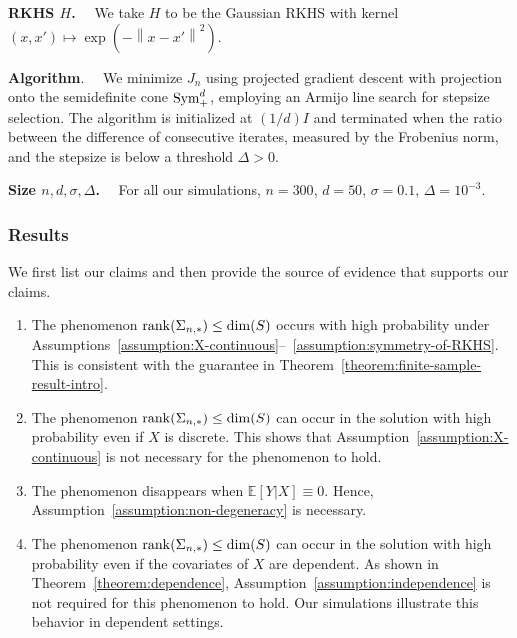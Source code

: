 \documentclass[sn-mathphys-num]{sn-jnl}%
\numberwithin{equation}{section}
\newcommand{\E}{\mathbb{E}}
\newcommand{\norm}[1]{\left\|{#1}\right\|} %
\newcommand{\rank}{{\rm rank}}
\newcommand{\Sym}{{\rm \mathrm{Sym}}}
\theoremstyle{thmstyleone}%
\theoremstyle{thmstyletwo}%
\theoremstyle{thmstylethree}%
\begin{document}
\vspace{.3cm}
\noindent\noindent
\textbf{RKHS $H$.}~~
We take $H$ to be the Gaussian RKHS with kernel $(x, x') \mapsto \exp(-\norm{x-x'}^2)$. 

\vspace{.3cm}
\noindent\noindent
\textbf{Algorithm}.~~
We minimize $J_n$ using projected gradient descent with projection onto the semidefinite cone $\Sym_+^d$, employing an Armijo line search for stepsize selection. The algorithm is initialized at $(1/d) I$ and terminated when the ratio between the difference of consecutive iterates, measured by the Frobenius norm, and the stepsize is below a threshold $\Delta > 0$.

\vspace{.3cm}
\noindent\noindent
\textbf{Size $n, d, \sigma, \Delta$.}~~ For all our simulations, $n = 300$, $d = 50$, $\sigma = 0.1$,
$\Delta = 10^{-3}$. 

\subsubsection{Results} 
We first list our claims and then provide the source of evidence that supports our claims.

\vspace{.5em}
\begin{enumerate}
\item[(1)] The phenomenon $\rank(\Sigma_{n, *}) \le \dim(S)$ occurs with high probability 
under Assumptions~\ref{assumption:X-continuous}--~\ref{assumption:symmetry-of-RKHS}.
This is consistent with the guarantee in Theorem~\ref{theorem:finite-sample-result-intro}.
\item[(2)] The phenomenon $\rank(\Sigma_{n, *}) \le \dim(S)$ can occur in the solution with high probability even if 
$X$ is discrete. This shows that Assumption~\ref{assumption:X-continuous} is not necessary for the phenomenon to hold. 
\item[(3)] The phenomenon disappears when $\E[Y|X] \equiv 0$. Hence, Assumption~\ref{assumption:non-degeneracy} is necessary. 
\item[(4)] The phenomenon $\rank(\Sigma_{n,*}) \le \dim(S)$ can occur in the solution with high probability even if 
the covariates of $X$ are dependent. As shown in Theorem~\ref{theorem:dependence}, Assumption~\ref{assumption:independence} is not required for this phenomenon to hold. Our simulations illustrate this behavior in dependent settings.
\end{enumerate}
\vspace{.5em}
\end{document}
